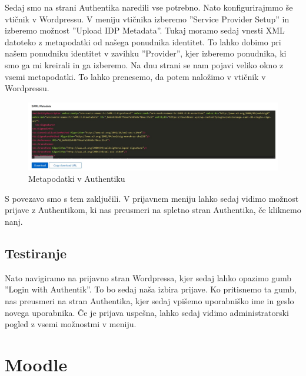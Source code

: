 \documentclass[a4paper,12pt,openright,oneside]{book}
\begin{document}
Sedaj smo na strani Authentika naredili vse potrebno. Nato konfigurirajmmo še vtičnik v Wordpressu. V meniju vtičnika izberemo ''Service Provider Setup'' in izberemo možnost ''Upload IDP Metadata''. Tukaj moramo sedaj vnesti XML datoteko z metapodatki od našega ponudnika identitet. To lahko dobimo pri našem ponudniku identitet v zavihku ''Provider'', kjer izberemo ponudnika, ki smo ga mi kreirali in ga izberemo. Na dnu strani se nam pojavi veliko okno z vsemi metapodatki. To lahko prenesemo, da potem naložimo v vtičnik v Wordpressu. 

\begin{figure}[H]
\hspace{-4cm}
\includegraphics[scale=0.5]{diploma-FRI-vzorec_11maj2021/SAMLMetadata.jpg}
\caption{Metapodatki v Authentiku}
\label{fig}
\end{figure}

S povezavo smo s tem zaključili. V prijavnem meniju lahko sedaj vidimo možnost prijave z Authentikom, ki nas preusmeri na spletno stran Authentika, če kliknemo nanj. 

\subsection{Testiranje}
Nato navigiramo na prijavno stran Wordpressa, kjer sedaj lahko opazimo gumb ''Login with Authentik''. To bo sedaj naša izbira prijave. Ko pritisnemo ta gumb, nas preusmeri na stran Authentika, kjer sedaj vpišemo uporabniško ime in geslo novega uporabnika. Če je prijava uspešna, lahko sedaj vidimo administratorski pogled z vsemi možnostmi v meniju. 


\section{Moodle}
\end{document}
